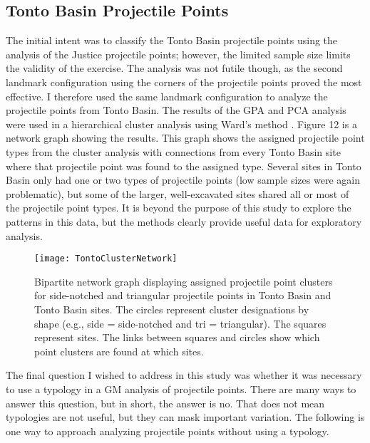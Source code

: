 \documentclass[PCJ,Unicode,screen,mode=plain]{cedram}
\begin{document}
\subsection{Tonto Basin Projectile Points}

The initial intent was to classify the Tonto Basin projectile points using the analysis of the Justice projectile points; however, the limited sample size limits the validity of the exercise. The analysis was not futile though, as the second landmark configuration using the corners of the projectile points proved the most effective. I therefore used the same landmark configuration to analyze the projectile points from Tonto Basin. The results of the GPA and PCA analysis were used in a hierarchical cluster analysis using Ward's method \autocite[see][]{Murtagh2014-mb}. Figure 12 is a network graph showing the results. This graph shows the assigned projectile point types from the cluster analysis with connections from every Tonto Basin site where that projectile point was found to the assigned type. Several sites in Tonto Basin only had one or two types of projectile points (low sample sizes were again problematic), but some of the larger, well-excavated sites shared all or most of the projectile point types. It is beyond the purpose of this study to explore the patterns in this data, but the methods clearly provide useful data for exploratory analysis.

\begin{figure}
\texttt{[image: TontoClusterNetwork]} \caption{Bipartite network graph displaying assigned projectile point clusters for side-notched and triangular projectile points in Tonto Basin and Tonto Basin sites. The circles represent cluster designations by shape (e.g., side = side-notched and tri = triangular). The squares represent sites. The links between squares and circles show which point clusters are found at which sites.}\label{fig:TontoClusterNetwork}
\end{figure}

The final question I wished to address in this study was whether it was necessary to use a typology in a GM analysis of projectile points. There are many ways to answer this question, but in short, the answer is no. That does not mean typologies are not useful, but they can mask important variation. The following is one way to approach analyzing projectile points without using a typology.
\end{document}
